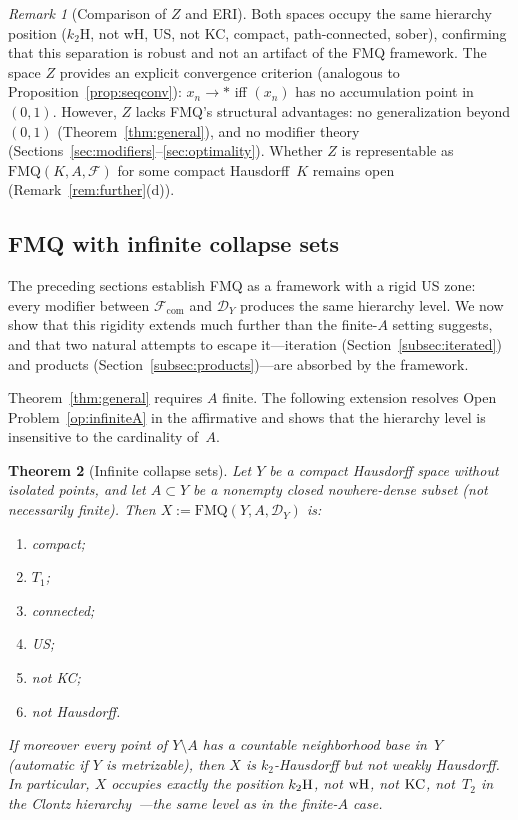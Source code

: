 \documentclass[11pt]{article}
\newtheorem{theorem}{Theorem}[section]
\theoremstyle{definition}
\theoremstyle{remark}
\newtheorem{remark}[theorem]{Remark}
\begin{document}
\begin{remark}[Comparison of $Z$ and ERI]\label{rmk:onepoint-role}
Both spaces occupy the same hierarchy position ($k_2$H, not wH, US,
not KC, compact, path-connected, sober), confirming that this
separation is robust and not an artifact of the FMQ framework.
The space $Z$ provides an explicit convergence criterion
(analogous to Proposition~\ref{prop:seqconv}):
$x_n \to \ast$ iff $(x_n)$ has no accumulation point in $(0,1)$.
However, $Z$ lacks FMQ's structural advantages:
no generalization beyond $(0,1)$
(Theorem~\ref{thm:general}), and no modifier theory
(Sections~\ref{sec:modifiers}--\ref{sec:optimality}).
Whether $Z$ is representable as
$\mathrm{FMQ}(K, A, \mathcal{F})$ for some compact Hausdorff~$K$
remains open (Remark~\ref{rem:further}(d)).
\end{remark}

\subsection{FMQ with infinite collapse sets}\label{subsec:rigidity}

The preceding sections establish FMQ as a framework with a rigid
US zone: every modifier between $\mathcal{F}_{\mathrm{com}}$ and
$\mathcal{D}_Y$ produces the same hierarchy level.
We now show that this rigidity extends much further than the
finite-$A$ setting suggests, and that two natural attempts to
escape it---iteration (Section~\ref{subsec:iterated}) and products
(Section~\ref{subsec:products})---are absorbed by the framework.

Theorem~\ref{thm:general} requires $A$ finite.
The following extension resolves Open Problem~\ref{op:infiniteA}
in the affirmative and shows that the hierarchy level is
insensitive to the cardinality of~$A$.

\begin{theorem}[Infinite collapse sets]\label{thm:infiniteA}
Let $Y$ be a compact Hausdorff space without isolated points,
and let $A \subset Y$ be a nonempty \emph{closed nowhere-dense}
subset \textup{(}not necessarily finite\textup{)}.
Then $X := \mathrm{FMQ}(Y, A, \mathcal{D}_Y)$ is:
\begin{enumerate}[label=\textup{(\alph*)},nosep]
\item compact;
\item $T_1$;
\item connected;
\item US;
\item not KC;
\item not Hausdorff.
\end{enumerate}
If moreover every point of $Y \setminus A$ has a countable
neighborhood base in~$Y$ \textup{(}automatic if $Y$ is
metrizable\textup{)}, then $X$ is $k_2$-Hausdorff but not weakly
Hausdorff.
In particular, $X$ occupies exactly the position
$k_2\textup{H}$, not $\textup{wH}$, not $\textup{KC}$,
not~$T_2$ in the Clontz hierarchy~\cite{bib:clontz}---the same level as in the
finite-$A$ case.
\end{theorem}
\end{document}
